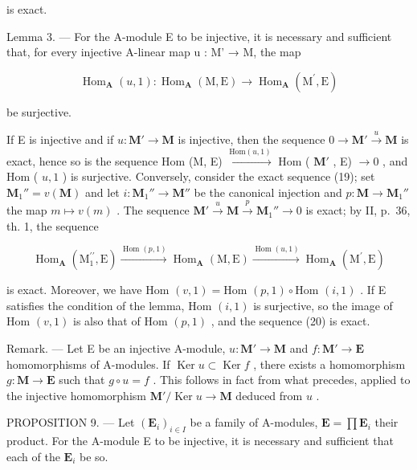 is exact.

Lemma 3. --- For the A-module E to be injective, it is necessary and sufficient that, for every injective A-linear map u : M' → M, the map

\[
\operatorname{Hom} _ {\mathbf {A}} (u, 1): \operatorname{Hom} _ {\mathbf {A}} (\mathrm{M}, \mathrm{E}) \rightarrow \operatorname{Hom} _ {\mathbf {A}} (\mathrm{M} ^ {\prime}, \mathrm{E})
\]

be surjective.

If E is injective and if \(u: \mathbf{M}' \to \mathbf{M}\) is injective, then the sequence \(0 \to \mathbf{M}' \xrightarrow{u} \mathbf{M}\) is exact, hence so is the sequence Hom (M, E) \(\xrightarrow{\text{Hom}(u,1)}\) Hom ( \(\mathbf{M}'\) , E) \(\to 0\) , and Hom ( \(u,1\) ) is surjective. Conversely, consider the exact sequence (19); set \(\mathbf{M}_{1}'' = v(\mathbf{M})\) and let \(i: \mathbf{M}_{1}'' \to \mathbf{M}''\) be the canonical injection and \(p: \mathbf{M} \to \mathbf{M}_{1}''\) the map \(m \mapsto v(m)\) . The sequence \(\mathbf{M}' \xrightarrow{u} \mathbf{M} \xrightarrow{p} \mathbf{M}_{1}'' \to 0\) is exact; by II, p.~36, th. 1, the sequence

\[
\operatorname{Hom} _ {\mathbf {A}} \left(\mathrm{M} _ {1} ^ {\prime \prime}, \mathrm{E}\right) \xrightarrow {\operatorname{Hom} (p , 1)} \operatorname{Hom} _ {\mathbf {A}} (\mathrm{M}, \mathrm{E}) \xrightarrow {\operatorname{Hom} (u , 1)} \operatorname{Hom} _ {\mathbf {A}} \left(\mathrm{M} ^ {\prime}, \mathrm{E}\right)
\]

is exact. Moreover, we have Hom \((v, 1) = \text{Hom } (p, 1) \circ \text{Hom } (i, 1)\) . If E satisfies the condition of the lemma, Hom \((i, 1)\) is surjective, so the image of Hom \((v, 1)\) is also that of Hom \((p, 1)\) , and the sequence (20) is exact.

Remark. --- Let E be an injective A-module, \(u: \mathbf{M}' \to \mathbf{M}\) and \(f: \mathbf{M}' \to \mathbf{E}\) homomorphisms of A-modules. If \(\operatorname{Ker} u \subset \operatorname{Ker} f\) , there exists a homomorphism \(g: \mathbf{M} \to \mathbf{E}\) such that \(g \circ u = f\) . This follows in fact from what precedes, applied to the injective homomorphism \(\mathbf{M}' / \operatorname{Ker} u \to \mathbf{M}\) deduced from \(u\) .

PROPOSITION 9. --- Let \((\mathbf{E}_i)_{i\in I}\) be a family of A-modules, \(\mathbf{E} = \prod \mathbf{E}_i\) their product. For the A-module E to be injective, it is necessary and sufficient that each of the \(\mathbf{E}_i\) be so.

